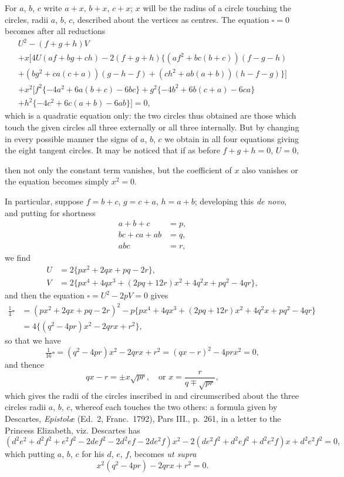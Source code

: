 \documentclass[11pt,a4paper]{article}
\begin{document}
For $a$, $b$, $c$ write $a+x$, $b+x$, $c+x$; $x$ will be the radius of a circle touching the circles, radii $a$, $b$, $c$, described about the vertices as centres. The equation $\square = 0$ becomes after all reductions
\begin{multline*}
U^2 - (f+g+h)V\\
+ x[4U(af+bg+ch) - 2(f+g+h)\{(af^2+bc(b+c))(f-g-h)\\
+ (bg^2+ca(c+a))(g-h-f) + (ch^2+ab(a+b))(h-f-g)\}]\\
+ x^2[f^2\{-4a^2+6a(b+c)-6bc\} + g^2\{-4b^2+6b(c+a)-6ca\}\\
+ h^2\{-4c^2+6c(a+b)-6ab\}] = 0,
\end{multline*}
which is a quadratic equation only: the two circles thus obtained are those which touch the given circles all three externally or all three internally. But by changing in every possible manner the signs of $a$, $b$, $c$ we obtain in all four equations giving the eight tangent circles. It may be noticed that if as before $f+g+h=0$, $U=0$,

\newpage
\setcounter{page}{512}

then not only the constant term vanishes, but the coefficient of $x$ also vanishes or the equation becomes simply $x^2 = 0$.

In particular, suppose $f=b+c$, $g=c+a$, $h=a+b$; developing this \textit{de novo}, and putting for shortness
\begin{align*}
a+b+c &= p,\\
bc+ca+ab &= q,\\
abc &= r,
\end{align*}
we find
\begin{align*}
U &= 2\{px^2 + 2qx + pq - 2r\},\\
V &= 2\{px^4 + 4qx^3 + (2pq + 12r)x^2 + 4q^2x + pq^2 - 4qr\},
\end{align*}
and then the equation $\square = U^2 - 2pV = 0$ gives
\begin{align*}
\tfrac{1}{4}\square &= (px^2 + 2qx + pq - 2r)^2 - p\{px^4 + 4qx^3 + (2pq+12r)x^2 + 4q^2x + pq^2 - 4qr\}\\
&= 4\{(q^2 - 4pr)x^2 - 2qrx + r^2\},
\end{align*}
so that we have
\[
\tfrac{1}{16}\square = (q^2 - 4pr)x^2 - 2qrx + r^2 = (qx-r)^2 - 4prx^2 = 0,
\]
and thence
\[
qx - r = \pm x\sqrt{pr},\quad \text{or } x = \frac{r}{q \mp \sqrt{pr}},
\]
which gives the radii of the circles inscribed in and circumscribed about the three circles radii $a$, $b$, $c$, whereof each touches the two others: a formula given by Descartes, \textit{Epistol\ae} (Ed.~2, Franc.~1792), Pars III., p.~261, in a letter to the Princess Elizabeth, viz. Descartes has
\[
(d^2e^2 + d^2f^2 + e^2f^2 - 2def^2 - 2d^2ef - 2de^2f)x^2 - 2(de^2f^2 + d^2ef^2 + d^2e^2f)x + d^2e^2f^2 = 0,
\]
which putting $a$, $b$, $c$ for his $d$, $e$, $f$, becomes \textit{ut supra}
\[
x^2(q^2 - 4pr) - 2qrx + r^2 = 0.
\]
\end{document}
